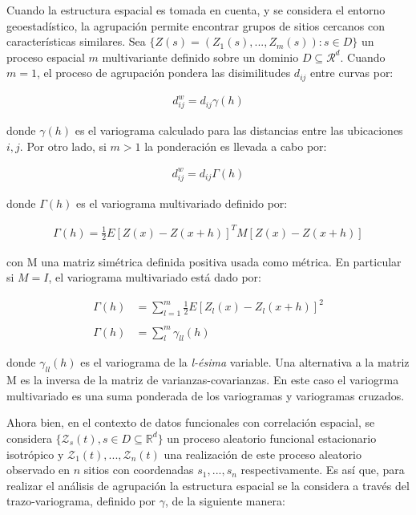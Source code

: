 \documentclass[
]{book}
\begin{document}
Cuando la estructura espacial es tomada en cuenta, y se considera el entorno geoestadístico, la agrupación permite encontrar grupos de sitios cercanos con características similares. Sea \(\{Z(s)=(Z_1(s),...,Z_m(s)): s\in D\}\) un proceso espacial \(m\) multivariante definido sobre un dominio \(D\subseteq \mathcal{R}^d\). Cuando \(m=1\), el proceso de agrupación pondera las disimilitudes \(d_{ij}\) entre curvas por:

\begin{align*}
    d_{ij}^w=d_{ij}\gamma(h)
\end{align*}

donde \(\gamma(h)\) es el variograma calculado para las distancias entre las ubicaciones \(i,j\). Por otro lado, si \(m>1\) la ponderación es llevada a cabo por:

\begin{align*}
    d_{ij}^w=d_{ij}\Gamma(h)
\end{align*}

donde \(\Gamma(h)\) es el variograma multivariado definido por:

\begin{align*}
    \Gamma(h)=\frac{1}{2}E[Z(x)-Z(x+h)]^T M[Z(x)-Z(x+h)]
\end{align*}

con M una matriz simétrica definida positiva usada como métrica. En particular si \(M=I\), el variograma multivariado está dado por:

\begin{align*}
    \Gamma(h)&=\sum_{l=1}^m \frac{1}{2} E[Z_l (x) - Z_l (x+h)]^2\\\\
    \Gamma(h)&=\sum_{l}^m \gamma_{ll}(h)
\end{align*}

donde \(\gamma_{ll}(h)\) es el variograma de la \emph{l-ésima} variable. Una alternativa a la matriz M es la inversa de la matriz de varianzas-covarianzas. En este caso el variogrma multivariado es una suma ponderada de los variogramas y variogramas cruzados.

Ahora bien, en el contexto de datos funcionales con correlación espacial, se considera \(\{\mathcal{Z}_s(t), s\in D\subseteq \mathbb{R}^d\}\) un proceso aleatorio funcional estacionario isotrópico y \(\mathcal{Z}_1(t),...,\mathcal{Z}_n(t)\) una realización de este proceso aleatorio observado en \(n\) sitios con coordenadas \(s_1,...,s_n\) respectivamente. Es así que, para realizar el análisis de agrupación la estructura espacial se la considera a través del trazo-variograma, definido por \(\gamma\), de la siguiente manera:
\end{document}
